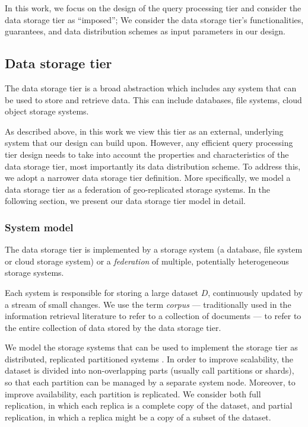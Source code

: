In this work, we focus on the design of the query processing tier and consider the data storage tier as ``imposed'';
We consider the data storage tier's functionalities, guarantees, and data distribution schemes as input parameters in
our design.


\subsection{Data storage tier}

The data storage tier is a broad abstraction which includes any system that can be used to store and retrieve data.
This can include databases, file systems, cloud object storage systems.

As described above, in this work we view this tier as an external, underlying system that our design can build upon.
However, any efficient query processing tier design needs to take into account the properties and characteristics of the
data storage tier, most importantly its data distribution scheme.
To address this, we adopt a narrower data storage tier definition.
More specifically, we model a data storage tier as a federation of geo-replicated storage systems.
In the following section, we present our data storage tier model in detail.


\subsubsection{System model}
The data storage tier is implemented by a storage system (a database, file system or cloud storage system) or a
\textit{federation} of multiple, potentially heterogeneous storage systems.

Each system is responsible for storing a large dataset $D$, continuously updated by a stream of small changes.
We use the term \textit{corpus}  --- traditionally used in the information retrieval literature to refer to a collection of documents ---
to refer to the entire collection of data stored by the data storage tier.

We model the storage systems that can be used to implement the storage tier as distributed, replicated partitioned systems \cite{agrawal:taxonomy}.
In order to improve scalability, the dataset is divided into non-overlapping parts (usually call partitions or shards),
so that each partition can be managed by a separate system node.
Moreover, to improve availability, each partition is replicated.
We consider both full replication, in which each replica is a complete copy of the dataset,
and partial replication, in which a replica might be a copy of a subset of the dataset.

